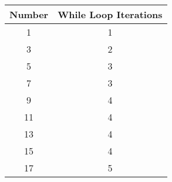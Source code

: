 \begin{center}
    \begin{tabular}{|c c|} 
    \hline
    Number & While Loop Iterations \\ [0.5ex] 
    \hline
    1 & 1 \\ 
    \hline
    3 & 2\\
    \hline
    5 & 3 \\
    \hline
    7 & 3\\
    \hline
    9 & 4 \\ 
    \hline
    11 & 4 \\ 
    \hline
    13 & 4 \\ 
    \hline
    15 & 4 \\ 
    \hline
    17 & 5 \\ 
    \hline
   \end{tabular}
\end{center}